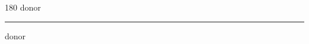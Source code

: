 
\begin{frame}
\begin{center}
\begin{turn}{180}
{\fontsize{2.5cm}{1em}\selectfont donor}
\end{turn}
\vspace{1em}\par  
\hrule
\vspace{1em}\par  
{\fontsize{2.5cm}{1em}\selectfont donor}
\end{center}
\end{frame}
